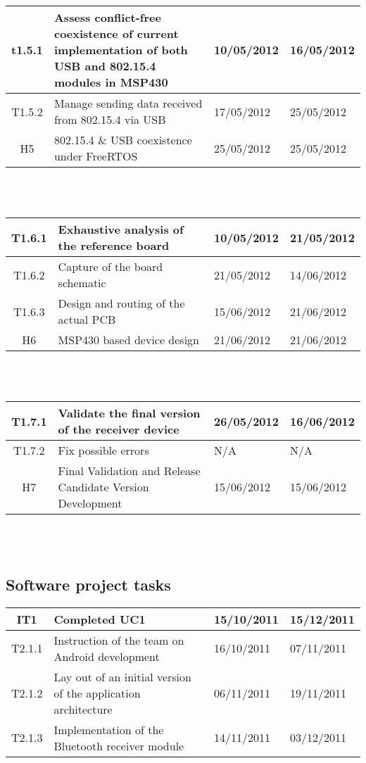		\begin{tabular}{| c | p{6cm} | l | l |} %
		\hline
t1.5.1 & Assess conflict-free coexistence of current implementation of both USB and 802.15.4 modules in MSP430 & 10/05/2012 & 16/05/2012\\ \hline
T1.5.2 & Manage sending data received from 802.15.4 via USB & 17/05/2012 & 25/05/2012\\ \hline
H5 & 802.15.4 \& USB coexistence under FreeRTOS & 25/05/2012 & 25/05/2012\\ \hline
		\end{tabular}\\\\

		\begin{tabular}{| c | p{6cm} | l | l |} %
		\hline
T1.6.1 & Exhaustive analysis of the reference board & 10/05/2012 & 21/05/2012\\ \hline
T1.6.2 & Capture of the board schematic & 21/05/2012 & 14/06/2012\\ \hline
T1.6.3 & Design and routing of the actual PCB & 15/06/2012 & 21/06/2012\\ \hline
H6 & MSP430 based device design & 21/06/2012 & 21/06/2012\\ \hline
		\end{tabular}\\\\

		\begin{tabular}{| c | p{6cm} | l | l |} %
		\hline
T1.7.1 & Validate the final version of the receiver device & 26/05/2012 & 16/06/2012\\ \hline
T1.7.2 & Fix possible errors & N/A & N/A \\ \hline
H7 & Final Validation and Release Candidate Version Development & 15/06/2012 & 15/06/2012\\
		\hline
		\end{tabular}\\\\

		\newpage
		\subsection{Software project tasks}

		\begin{tabular}{| c | p{6cm} | l | l |} %
		\hline
IT1 & Completed UC1 & 15/10/2011 & 15/12/2011\\ \hline
   T2.1.1 & Instruction of the team on Android development & 16/10/2011 & 07/11/2011\\ \hline
   T2.1.2 & Lay out of an initial version of the application architecture & 06/11/2011 & 19/11/2011\\ 
   T2.1.3 & Implementation of the Bluetooth receiver module & 14/11/2011 & 03/12/2011\\ \hline
		\end{tabular}\\\\

